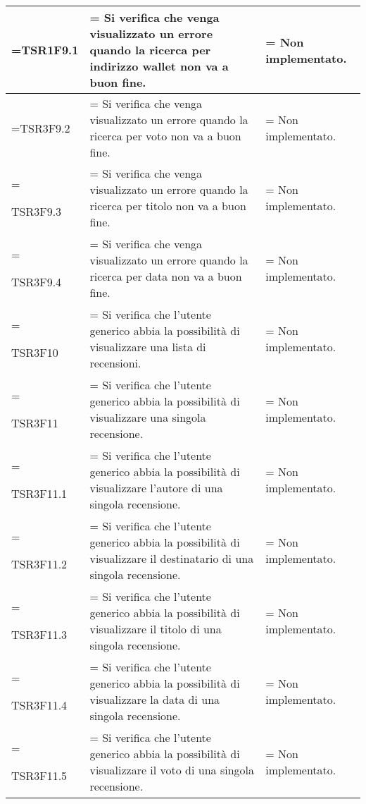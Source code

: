 \begin{xltabular}{\textwidth} {
        >{\hsize\linewidth=\hsize}X
        >{\hsize\linewidth=\hsize}X
        >{\hsize\linewidth=\hsize}X
    }
    TSR1F9.1&
    Si verifica che venga visualizzato un errore quando la ricerca per indirizzo wallet non va a buon fine. &
    Non implementato.
    \\ \hline
    
    TSR3F9.2&
    Si verifica che venga visualizzato un errore quando la ricerca per voto non va a buon fine. &
    Non implementato.
    \\ \hline
    
    TSR3F9.3&
    Si verifica che venga visualizzato un errore quando la ricerca per titolo non va a buon fine. &
    Non implementato.
    \\ \hline

    TSR3F9.4&
    Si verifica che venga visualizzato un errore quando la ricerca per data non va a buon fine. &
    Non implementato.
    \\ \hline

    TSR3F10 &
    Si verifica che l'utente generico abbia la possibilità di visualizzare una lista di recensioni.  &
    Non implementato.
    \\ \hline

    TSR3F11 &
    Si verifica che l'utente generico abbia la possibilità di visualizzare una singola recensione. &
    Non implementato.
    \\ \hline

    TSR3F11.1 &
    Si verifica che l'utente generico abbia la possibilità di visualizzare l'autore di una singola recensione.  &
    Non implementato.
    \\ \hline

    TSR3F11.2 &
    Si verifica che l'utente generico abbia la possibilità di visualizzare il destinatario di una singola recensione.  &
    Non implementato.
    \\ \hline

    TSR3F11.3 &
    Si verifica che l'utente generico abbia la possibilità di visualizzare il titolo di una singola recensione.  &
    Non implementato.
    \\ \hline

    TSR3F11.4 &
    Si verifica che l'utente generico abbia la possibilità di visualizzare la data di una singola recensione.  &
    Non implementato.
    \\ \hline
    
    TSR3F11.5 &
    Si verifica che l'utente generico abbia la possibilità di visualizzare il voto di una singola recensione.  &
    Non implementato.
    \\ \hline


\end{xltabular}
